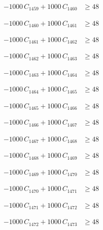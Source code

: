 \documentclass[a4paper,11pt]{article}
\begin{document}
\begin{align}
-1000\,C_{1459} + 1000\,C_{1460} &\geq 48 \nonumber
\end{align}

\begin{align}
-1000\,C_{1460} + 1000\,C_{1461} &\geq 48 \nonumber
\end{align}

\begin{align}
-1000\,C_{1461} + 1000\,C_{1462} &\geq 48 \nonumber
\end{align}

\begin{align}
-1000\,C_{1462} + 1000\,C_{1463} &\geq 48 \nonumber
\end{align}

\begin{align}
-1000\,C_{1463} + 1000\,C_{1464} &\geq 48 \nonumber
\end{align}

\begin{align}
-1000\,C_{1464} + 1000\,C_{1465} &\geq 48 \nonumber
\end{align}

\begin{align}
-1000\,C_{1465} + 1000\,C_{1466} &\geq 48 \nonumber
\end{align}

\begin{align}
-1000\,C_{1466} + 1000\,C_{1467} &\geq 48 \nonumber
\end{align}

\begin{align}
-1000\,C_{1467} + 1000\,C_{1468} &\geq 48 \nonumber
\end{align}

\begin{align}
-1000\,C_{1468} + 1000\,C_{1469} &\geq 48 \nonumber
\end{align}

\begin{align}
-1000\,C_{1469} + 1000\,C_{1470} &\geq 48 \nonumber
\end{align}

\begin{align}
-1000\,C_{1470} + 1000\,C_{1471} &\geq 48 \nonumber
\end{align}

\begin{align}
-1000\,C_{1471} + 1000\,C_{1472} &\geq 48 \nonumber
\end{align}

\begin{align}
-1000\,C_{1472} + 1000\,C_{1473} &\geq 48 \nonumber
\end{align}
\end{document}
